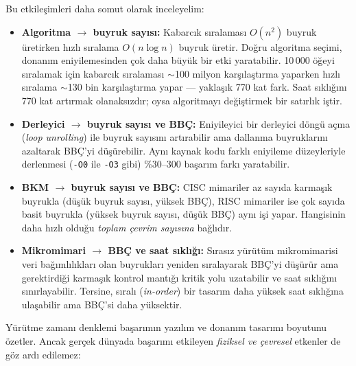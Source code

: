 Bu etkileşimleri daha somut olarak inceleyelim:
\begin{itemize}
    \item \textbf{Algoritma $\rightarrow$ buyruk sayısı:} Kabarcık sıralaması $O(n^2)$ buyruk üretirken hızlı sıralama $O(n \log n)$ buyruk üretir. Doğru algoritma seçimi, donanım eniyilemesinden çok daha büyük bir etki yaratabilir. 10\,000 öğeyi sıralamak için kabarcık sıralaması $\sim$100 milyon karşılaştırma yaparken hızlı sıralama $\sim$130 bin karşılaştırma yapar --- yaklaşık 770 kat fark. Saat sıklığını 770 kat artırmak olanaksızdır; oysa algoritmayı değiştirmek bir satırlık iştir.

    \item \textbf{Derleyici $\rightarrow$ buyruk sayısı ve BBÇ:} Eniyileyici bir derleyici döngü açma (\emph{loop unrolling}) ile buyruk sayısını artırabilir ama dallanma buyruklarını azaltarak BBÇ'yi düşürebilir. Aynı kaynak kodu farklı eniyileme düzeyleriyle derlenmesi (\texttt{-O0} ile \texttt{-O3} gibi) \%30--300 başarım farkı yaratabilir.

    \item \textbf{BKM $\rightarrow$ buyruk sayısı ve BBÇ:} CISC mimariler az sayıda karmaşık buyrukla (düşük buyruk sayısı, yüksek BBÇ), RISC mimariler ise çok sayıda basit buyrukla (yüksek buyruk sayısı, düşük BBÇ) aynı işi yapar. Hangisinin daha hızlı olduğu \emph{toplam çevrim sayısına} bağlıdır.

    \item \textbf{Mikromimari $\rightarrow$ BBÇ ve saat sıklığı:} Sırasız yürütüm mikromimarisi veri bağımlılıkları olan buyrukları yeniden sıralayarak BBÇ'yi düşürür ama gerektirdiği karmaşık kontrol mantığı kritik yolu uzatabilir ve saat sıklığını sınırlayabilir. Tersine, sıralı (\emph{in-order}) bir tasarım daha yüksek saat sıklığına ulaşabilir ama BBÇ'si daha yüksektir.
\end{itemize}

Yürütme zamanı denklemi başarımın yazılım ve donanım tasarımı boyutunu özetler. Ancak gerçek dünyada başarımı etkileyen \emph{fiziksel ve çevresel} etkenler de göz ardı edilemez:


